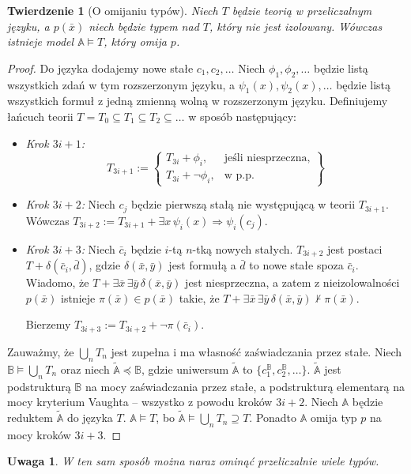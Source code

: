 \documentclass{article}
\newcommand{\A}{\mathbb{A}}
\newcommand{\B}{\mathbb{B}}
\theoremstyle{plain}
\newtheorem{tw}[thm]{Twierdzenie}
\newtheorem{uw}[thm]{Uwaga}
\theoremstyle{definition}
\theoremstyle{remark}
\begin{document}
\begin{tw}[O omijaniu typów]
	\label{tw:omi}
	Niech $T$ będzie teorią w przeliczalnym języku, a $p(\bar{x})$ niech będzie typem nad $T$, który nie jest izolowany.
	Wówczas istnieje model $\A \models T$, który omija $p$.
\end{tw}
\begin{proof}
	Do języka dodajemy nowe stałe $c_1, c_2, \ldots$
	Niech $\phi_1, \phi_2, \ldots $ będzie listą wszystkich zdań w tym rozszerzonym języku, a $\psi_1(x), \psi_2(x), \ldots$ będzie listą wszystkich formuł z jedną zmienną wolną w rozszerzonym języku.
	Definiujemy łańcuch teorii $T = T_0 \subseteq T_1 \subseteq T_2 \subseteq \ldots$
	w sposób następujący:
	\begin{itemize}
		\item \textit{Krok $3i+1$:}
			\[
				 T_{3i+1} := \left\{\begin{array}{lr}
						 T_{3i} + \phi_i, & \text{jeśli niesprzeczna,}\\
						 T_{3i} + \neg \phi_i, & \text{w p.p.}
				 \end{array}\right\}
			\]

		\item \textit{Krok $3i+2$:}
			Niech $c_j$ będzie pierwszą stałą nie występującą w teorii $T_{3i+1}$.
			Wówczas $T_{3i+2} := T_{3i+1} + \exists x \, \psi_i(x) \Rightarrow \psi_i(c_j)$.
		\item \textit{Krok $3i+3$:}
			Niech $\bar{c}_i$ będzie $i$-tą $n$-tką nowych stałych.
			$T_{3i+2}$ jest postaci $T + \delta(\bar{c}_i, \bar{d})$, gdzie $\delta(\bar{x}, \bar{y})$ jest formułą a $\bar{d}$ to nowe stałe spoza $\bar{c}_i$.
			Wiadomo, że $T + \exists \bar{x} \, \exists \bar{y} \, \delta(\bar{x}, \bar{y})$ jest niesprzeczna, a zatem z nieizolowalności $p(\bar{x})$ istnieje $\pi(\bar{x}) \in p(\bar{x})$ takie, że $T + \exists \bar{x} \, \exists \bar{y} \, \delta(\bar{x}, \bar{y}) \not \vdash \pi(\bar{x})$.

			Bierzemy $T_{3i+3} := T_{3i+2} + \neg \pi(\bar{c}_i)$.
	\end{itemize}
	Zauważmy, że $\bigcup_n T_n$ jest zupełna i ma własność zaświadczania przez stałe.
	Niech $\B \models \bigcup_n T_n$ oraz niech $\widetilde{\A} \preccurlyeq \B$, gdzie uniwersum $\widetilde{\A}$ to $\{c_1^{\B}, c_2^{\B}, \ldots\}$.
	$\widetilde{\A}$ jest podstrukturą $\B$ na mocy zaświadczania przez stałe, a podstrukturą elementarą na mocy kryterium Vaughta -- wszystko z powodu kroków $3i+2$.
	Niech $\A$ będzie reduktem $\widetilde{\A}$ do języka $T$.
	$\A \models T$, bo $\widetilde{\A} \models \bigcup_n T_n \supseteq T$.
	Ponadto $\A$ omija typ $p$ na mocy kroków $3i+3$.

\end{proof}
\begin{uw}
	 W ten sam sposób można naraz ominąć przeliczalnie wiele typów.
\end{uw}
\end{document}

